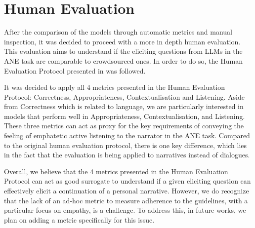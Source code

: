 
\section{Human Evaluation}
After the comparison of the models through automatic metrics and manual inspection, it was decided to proceed with a more in depth human evaluation. This evaluation aims to understand if the eliciting questions from LLMs in the ANE task are comparable to crowdsourced ones. In order to do so, the Human Evaluation Protocol presented in \cite{mousavi-etal-2022-evaluation} was followed. 


It was decided to apply all 4 metrics presented in the Human Evaluation Protocol: Correctness, Appropriateness, Contextualisation and Listening. Aside from Correctness which is related to language, we are particularly interested in models that perform well in Appropriateness, Contextualisation, and Listening. These three metrics can act as proxy for the key requirements of conveying the feeling of emphatetic active listening  to the narrator in the ANE task. Compared to the original human evaluation protocol, there is one key difference, which lies in the fact that the evaluation is being applied to narratives instead of dialogues. 

Overall, we believe that the 4 metrics presented in the Human Evaluation Protocol can act as good surrogate to understand if a given eliciting question can effectively elicit a continuation of a personal narrative. However, we do recognize that the lack of an ad-hoc metric to measure adherence to the guidelines, with a particular focus on empathy, is a challenge. To address this, in future works, we plan on adding a metric  specifically for this issue.

